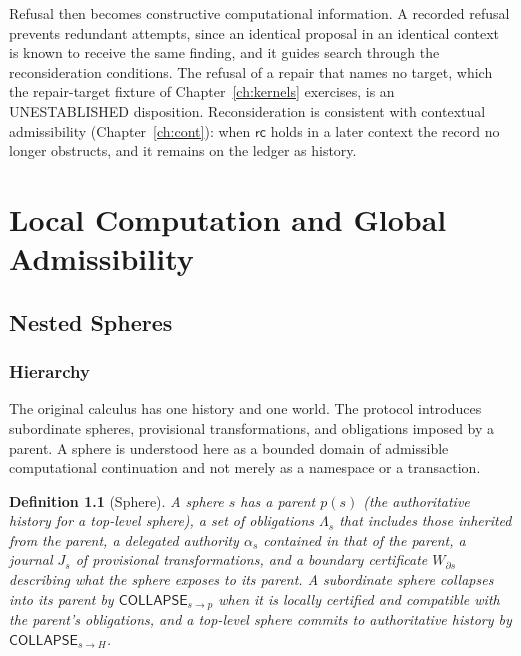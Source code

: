 \documentclass[12pt,oneside,openany]{book}
\theoremstyle{spherepop}
\newtheorem{definition}{Definition}[chapter]
\theoremstyle{remarkstyle}
\begin{document}
Refusal then becomes constructive computational information. A recorded refusal prevents redundant attempts, since an identical proposal in an identical context is known to receive the same finding, and it guides search through the reconsideration conditions. The refusal of a repair that names no target, which the repair-target fixture of Chapter~\ref{ch:kernels} exercises, is an \textsf{UNESTABLISHED} disposition. Reconsideration is consistent with contextual admissibility (Chapter~\ref{ch:cont}): when $\mathsf{rc}$ holds in a later context the record no longer obstructs, and it remains on the ledger as history.

\part{Local Computation and Global Admissibility}
\label{part:local}

\chapter{Nested Spheres}
\label{ch:nested}

\section{Hierarchy}

The original calculus has one history and one world. The protocol introduces subordinate spheres, provisional transformations, and obligations imposed by a parent. A sphere is understood here as a bounded domain of admissible computational continuation and not merely as a namespace or a transaction.

\begin{definition}[Sphere]
A \emph{sphere} $s$ has a parent $p(s)$ (the authoritative history for a top-level sphere), a set of obligations $\Lambda_s$ that includes those inherited from the parent, a delegated authority $\alpha_s$ contained in that of the parent, a journal $J_s$ of provisional transformations, and a boundary certificate $W_{\partial s}$ describing what the sphere exposes to its parent. A subordinate sphere \emph{collapses into its parent} by $\mathsf{COLLAPSE}_{s\to p}$ when it is locally certified and compatible with the parent's obligations, and a top-level sphere commits to authoritative history by $\mathsf{COLLAPSE}_{s\to H}$.
\end{definition}
\end{document}
